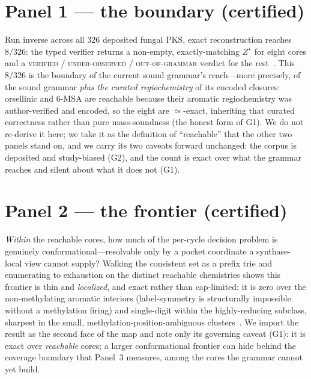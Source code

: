 \documentclass[11pt]{article}
\newcommand{\zstar}{$Z^\star$}
\begin{document}
\section{Panel 1 --- the boundary (certified)}
\label{sec:boundary}
Run inverse across all $326$ deposited fungal PKS, exact reconstruction reaches $8/326$: the typed
verifier returns a non-empty, exactly-matching \zstar{} for eight cores and a \textsc{verified} /
\textsc{under-observed} / \textsc{out-of-grammar} verdict for the rest~\citep{eilertsen2026preprint}.
This $8/326$ is the boundary of the current sound grammar's reach---more precisely, of the sound
grammar \emph{plus the curated regiochemistry} of its encoded closures: orsellinic and 6-MSA are
reachable because their aromatic regiochemistry was author-verified and encoded, so the eight are
$\simeq$-exact, inheriting that curated correctness rather than pure mass-soundness (the honest form
of G1). We do not re-derive it here; we
take it as the definition of ``reachable'' that the other two panels stand on, and we carry its two
caveats forward unchanged: the corpus is deposited and study-biased (G2), and the count is exact over
what the grammar reaches and silent about what it does not (G1).

\section{Panel 2 --- the frontier (certified)}
\label{sec:frontier}
\emph{Within} the reachable cores, how much of the per-cycle decision problem is genuinely
conformational---resolvable only by a pocket coordinate a synthase-local view cannot supply? Walking
the consistent set as a prefix trie and enumerating to exhaustion on the distinct reachable chemistries
shows this frontier is thin and \emph{localized}, and exact rather than cap-limited: it is zero over
the non-methylating aromatic interiors (label-symmetry is structurally impossible without a methylation
firing) and single-digit within the highly-reducing subclass, sharpest in the small,
methylation-position-ambiguous clusters~\citep{eilertsen2026preprint}. We import the result as the
second face of the map and note only its governing caveat (G1): it is exact over \emph{reachable}
cores; a larger conformational frontier can hide behind the coverage boundary that Panel~3 measures,
among the cores the grammar cannot yet build.
\end{document}
